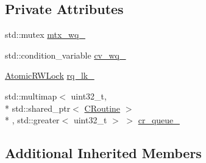 \subsection*{Private Attributes}
\begin{DoxyCompactItemize}
\item 
std\-::mutex \hyperlink{classapollo_1_1cyber_1_1scheduler_1_1ChoreographyContext_a4955bd10541d5f68187f69a5c9c25f2f}{mtx\-\_\-wq\-\_\-}
\item 
std\-::condition\-\_\-variable \hyperlink{classapollo_1_1cyber_1_1scheduler_1_1ChoreographyContext_a6089935be7f61f7231d1e0d822562d71}{cv\-\_\-wq\-\_\-}
\item 
\hyperlink{classapollo_1_1cyber_1_1base_1_1AtomicRWLock}{Atomic\-R\-W\-Lock} \hyperlink{classapollo_1_1cyber_1_1scheduler_1_1ChoreographyContext_a758b50ddb206c4792e855afaa15f6f2c}{rq\-\_\-lk\-\_\-}
\item 
std\-::multimap$<$ uint32\-\_\-t, \\*
std\-::shared\-\_\-ptr$<$ \hyperlink{classapollo_1_1cyber_1_1croutine_1_1CRoutine}{C\-Routine} $>$\\*
, std\-::greater$<$ uint32\-\_\-t $>$ $>$ \hyperlink{classapollo_1_1cyber_1_1scheduler_1_1ChoreographyContext_a9a1cbbf369ba6b3343f48d8b7fe062ad}{cr\-\_\-queue\-\_\-}
\end{DoxyCompactItemize}
\subsection*{Additional Inherited Members}



